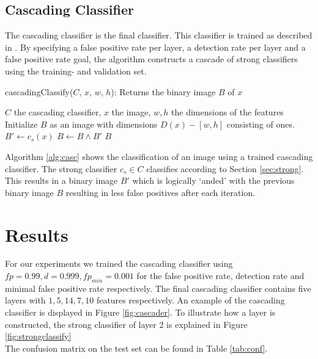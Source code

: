 \documentclass[a4paper,11pt]{article}
\begin{document}
\subsection{Cascading Classifier} \label{sec:casc}
The cascading classifier is the final classifier. This classifier is trained as
described in \cite{viola}. By specifying a false positive rate per layer, a
detection rate per layer and a false positive rate goal, the algorithm
constructs a cascade of strong classifiers using the training- and validation
set.
\begin{algorithm}
	\caption{cascadingClassify($C$, $x$, $w$, $h$): Returns the binary image $B$ of $x$}
	\begin{algorithmic}[1]
	\REQUIRE $C$ the cascading classifier, $x$ the image, $w,h$ the dimensions of the features
	\medskip
	\STATE Initialize $B$ as an image with dimensions $D(x) - [w,h]$ consisting of ones.
		\STATE $B' \leftarrow c_s(x)$
		\STATE $B \leftarrow B \land B'$
	\ENDFOR
	\RETURN $B$
	\end{algorithmic}
\label{alg:casc}
\end{algorithm}
Algorithm \ref{alg:casc} shows the classification of an image using a trained
cascading classifier. The strong classifier $c_s \in C$ classifies according to
Section \ref{sec:strong}. This results in a binary image $B'$ which is
logically `anded' with the previous binary image $B$ resulting in less false
positives after each iteration.

\section{Results} \label{sec:res}
For our experiments we trained the cascading classifier using $fp = 0.99, d =
0.999, fp_{min} = 0.001$ for the false positive rate, detection rate and
minimal false positive rate respectively. The final cascading classifier
contains five layers with $1, 5, 14, 7, 10$ features respectively. An example
of the cascading classifier is displayed in Figure \ref{fig:cascader}. To
illustrate how a layer is constructed, the strong classifier of layer 2 is
explained in Figure \ref{fig:strongclassify}\\
The confusion matrix on the test set can be found in Table \ref{tab:conf}. 
\end{document}
